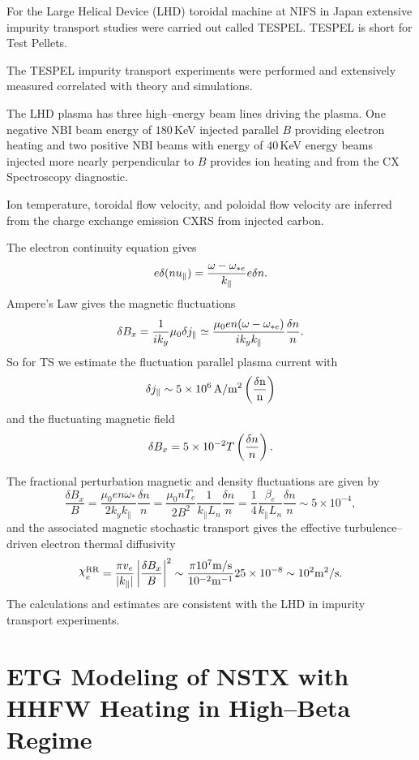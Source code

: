 \documentclass[a4paper,openany,12pt]{book}
\def\chix{\raise.5ex\hbox{$\chi$}}
\begin{document}
For the Large Helical Device (LHD) toroidal machine at NIFS in Japan extensive impurity transport studies were carried out called TESPEL. TESPEL is short for Test Pellets.

The TESPEL impurity transport experiments were performed and extensively measured correlated with theory and simulations.

The LHD plasma has three high--energy beam lines driving the plasma. One negative NBI beam energy of $180\,$KeV injected parallel $B$ providing electron heating and two positive NBI beams with energy of $40\,$KeV energy beams injected more nearly perpendicular to $B$ provides ion heating and from the CX Spectroscopy diagnostic.

Ion temperature, toroidal flow velocity, and poloidal flow velocity are inferred from the charge exchange emission CXRS from injected carbon.

The electron continuity equation gives
$$e\delta(nu_\|)={\omega-\omega_{*e}\over k_\|}e\delta n.$$
Ampere's Law gives the magnetic fluctuations
$$\delta B_x={1\over ik_y}\mu_0\delta j_\|\simeq{\mu_0en(\omega-\omega_{*e})\over ik_yk_\|}{\delta n\over n}.$$
So for TS we estimate the fluctuation parallel plasma current with
$$\delta j_\|\sim 5\times 10^6\,\rm A/m^2\left({\delta n\over n}\right)$$
and the fluctuating magnetic field
$$\delta B_x=5\times 10^{-2}T\left({\delta n\over n}\right).$$

The fractional perturbation magnetic and density fluctuations are given by
$$\frac{\delta B_x}{B}=\frac{\mu_0en\omega_*}{2k_yk_\|}\frac{\delta n}{n}=\frac{\mu_0nT_e}{2B^2}\frac{1}{k_\|L_n}\frac{\delta n}{n}=\frac{1}{4}\frac{\beta_e}{k_\|L_{n}}\frac{\delta n}{n}\sim 5\times 10^{-4},$$
and the associated magnetic stochastic transport gives the effective turbulence--driven electron thermal diffusivity
$$\chix_e^{\rm RR}={\pi v_e\over|k_\||}\left|{\delta B_x\over B}\right|^2\sim{\pi 10^7\rm m/s\over 10^{-2}\rm m^{-1}}25\times 10^{-8}\sim 10^2\rm m^2/s.$$
The calculations and estimates are consistent with the LHD in impurity transport experiments.

\section{ETG Modeling of NSTX with HHFW Heating in High--Beta Regime}
\end{document}
